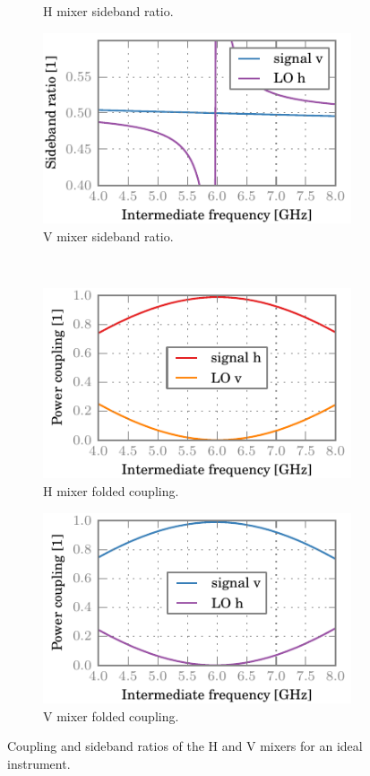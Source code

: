 \begin{figure}[hbtp]
\begin{subfigure}[b]{.5\textwidth}
        \caption{H mixer sideband ratio.}
    \end{subfigure}%
    \begin{subfigure}[b]{.5\textwidth}
        \includegraphics{chapter_3/02_realgrids_v_sbr}%
        \caption{V mixer sideband ratio.}
    \end{subfigure}%
    \\
    \begin{subfigure}[b]{.5\textwidth}
        \includegraphics{chapter_3/02_realgrids_h_ssb}%
        \caption{H mixer folded coupling.}
    \end{subfigure}%
    \begin{subfigure}[b]{.5\textwidth}
        \includegraphics{chapter_3/02_realgrids_v_ssb}%
        \caption{V mixer folded coupling.}
    \end{subfigure}%
    \caption{Coupling and sideband ratios of the H and V mixers for an ideal instrument.}
    \label{fig:02_realgrids}
\end{figure}

